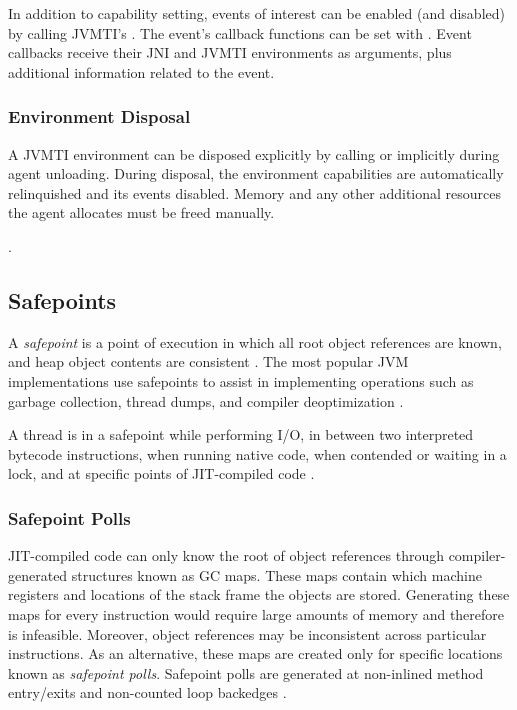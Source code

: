 In addition to capability setting, events of interest can be enabled (and disabled) by calling JVMTI's . The event's callback functions can be set with . Event callbacks receive their JNI and JVMTI environments as arguments, plus additional information related to the event.

\subsubsection*{Environment Disposal}

A JVMTI environment can be disposed explicitly by calling  or implicitly during agent unloading. During disposal, the environment capabilities are automatically relinquished and its events disabled. Memory and any other additional resources the agent allocates must be freed manually.

.

\subsection{Safepoints}

A \emph{safepoint} is a point of execution in which all root object references are known, and heap object contents are consistent \cite{hotspotglossary}. The most popular JVM implementations use safepoints to assist in implementing operations such as garbage collection, thread dumps, and compiler deoptimization \cite{lin2015yieldpoint}.

A thread is in a safepoint while performing I/O, in between two interpreted bytecode instructions, when running native code, when contended or waiting in a lock, and at specific points of JIT-compiled code \cite{wakart2015safepoints}.

\subsubsection*{Safepoint Polls}

JIT-compiled code can only know the root of object references through compiler-generated structures known as GC maps. These maps contain which machine registers and locations of the stack frame the objects are stored. Generating these maps for every instruction would require large amounts of memory and therefore is infeasible. Moreover, object references may be inconsistent across particular instructions. As an alternative, these maps are created only for specific locations known as \emph{safepoint polls}. Safepoint polls are generated at non-inlined method entry/exits and non-counted loop backedges \cite{hohenseehotspot}.

